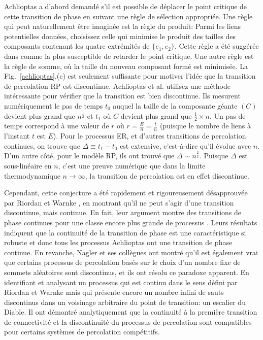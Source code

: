 Achlioptas a d'abord demandé s'il est possible de déplacer le point critique de cette transition de phase en suivant une règle de sélection appropriée. Une règle qui peut naturellement être imaginée est la règle du produit: Parmi les liens potentielles données, choisissez celle qui minimise le produit des tailles des composants contenant les quatre extrémités de $\{e_1,e_2\}$. Cette règle a été suggérée dans \cite{Bollobas-1984} comme la plus susceptible de retarder le point critique. Une autre règle est la règle de somme, où la taille du nouveau composant formé est minimisée. La Fig.~\ref{achlioptas}.(c) est seulement suffisante pour motiver l'idée que la transition de percolation RP est discontinue. Achlioptas et al. utilisez une méthode intéressante pour vérifier que la transition est bien discontinue. Ils mesurent numériquement le pas de temps $t_0$ auquel la taille de la composante géante $(C)$ devient plus grand que $n^{\frac{1}{2}}$ et $t_1$ où $C$ devient plus grand que $\frac{1}{2}\times n$. Un pas de temps correspond à une valeur de $r$ où $r=\frac{E}{n}=\frac{t}{n}$ (puisque le nombre de liens à l'instant $t$ est $E$). Pour le processus ER, et d'autres transitions de percolation continues, on trouve que $\Delta\equiv t_1-t_0$ est extensive, c'est-à-dire qu'il évolue avec $n$. D'un autre côté, pour le modèle RP, ils ont trouvé que $\Delta\sim n^{\frac{2}{3}}$. Puisque $\Delta$ est sous-linéaire en $n$, c'est une preuve numérique que dans la limite thermodynamique $n\rightarrow \infty$, la transition de percolation est en effet discontinue.

Cependant, cette conjecture a été rapidement et  rigoureusement désapprouvée par Riordan et Warnke \cite{Riordan-Warnke2011,Riordan-Warnke2012}, en montrant qu'il ne peut s'agir d'une transition discontinue, mais continue. En fait, leur argument montre des transitions de phase continues pour une classe encore plus grande de processus \cite{Riordan-Warnke2012}. Leurs résultats indiquent que la continuité de la transition de phase est une caractéristique si robuste et donc tous les processus Achlioptas ont une transition de phase continue. En revanche, Nagler et ses collègues \cite{Nagler-al2012} ont montré qu'il est également vrai que certains processus de percolation basés sur le choix d'un nombre fixe de sommets aléatoires sont discontinus, et ils ont résolu ce paradoxe apparent. En identifiant et analysant un processus qui est continu dans le sens défini par Riordan et Warnke \cite{Riordan-Warnke2012} mais qui présente encore un nombre infini de sauts discontinus dans un voisinage arbitraire du point de transition: un escalier du Diable. Il ont démontré analytiquement que la continuité à la première transition de connectivité et la discontinuité du processus de percolation sont compatibles pour certains systèmes de percolation compétitifs.\\

